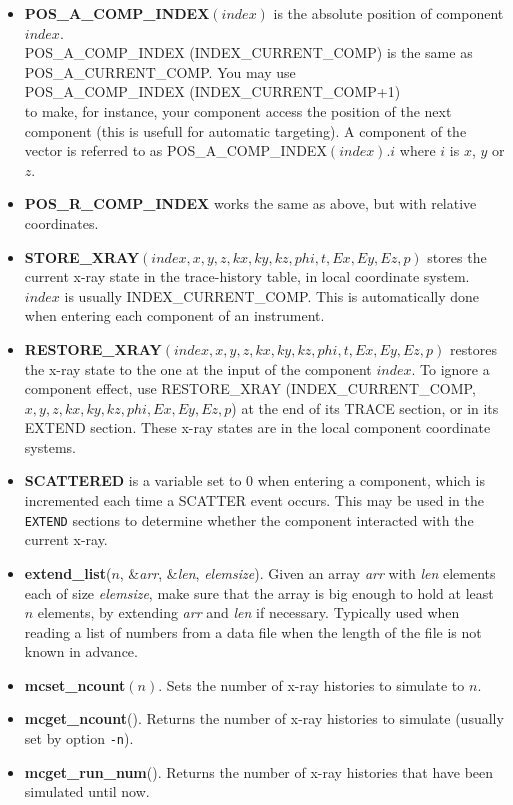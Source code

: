 \begin{itemize}
\item {\bfseries POS\_A\_COMP\_INDEX}$(index)$ is the absolute position of
  component $index$. \\
  POS\_A\_COMP\_INDEX (INDEX\_CURRENT\_COMP) is the same as \\
  POS\_A\_CURRENT\_COMP. You may use \\
  POS\_A\_COMP\_INDEX  (INDEX\_CURRENT\_COMP+1) \\
  to make, for instance, your
  component access the position of the next component (this is usefull for
  automatic targeting).  A component of the vector is referred to as
  POS\_A\_COMP\_INDEX$(index).i$ where $i$ is $x$, $y$ or $z$.
\item {\bfseries POS\_R\_COMP\_INDEX} works the same as above,
  but with relative coordinates.
\item {\bfseries STORE\_XRAY}$(index, x, y, z, kx, ky, kz, phi,t, Ex, Ey,
Ez, p)$ stores the current x-ray state in the trace-history table,
in local coordinate system. $index$ is usually INDEX\_CURRENT\_COMP.
This is automatically done when entering each component of an
instrument.
\item {\bfseries RESTORE\_XRAY}$(index, x, y, z, kx, ky, kz, phi,t, Ex, Ey,
Ez, p)$ restores the x-ray state to the one at the input of the
component $index$. To ignore a component effect, use
RESTORE\_XRAY (INDEX\_CURRENT\_COMP, \\
$x, y, z, kx, ky, kz, phi,
Ex, Ey, Ez, p$) at the end of its TRACE section, or in its EXTEND
section. These x-ray states are in the local component coordinate
systems.
\item {\bfseries SCATTERED} is a variable set to 0 when entering
  a component, which is incremented each time a SCATTER event occurs.
  This may be used in the \verb+EXTEND+ sections to determine whether
  the component interacted with the current x-ray.
\item {\bfseries extend\_list}($n$, \&\textit{arr}, \&\textit{len},
  \textit{elemsize}). Given an array \textit{arr} with \textit{len}
  elements each of size \textit{elemsize}, make sure that the array is
  big enough to hold at least $n$ elements, by extending \textit{arr}
  and \textit{len} if necessary. Typically used when reading a list of
  numbers from a data file when the length of the file is not known in advance.
\item {\bfseries mcset\_ncount}$(n)$. Sets the number of x-ray histories to simulate to $n$.
\item {\bfseries mcget\_ncount}(). Returns the number of x-ray histories to simulate (usually set by option \verb+-n+).
\item {\bfseries mcget\_run\_num}(). Returns the number of x-ray histories that have been simulated until now.
\end{itemize}

